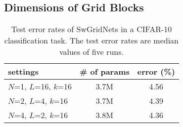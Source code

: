 \documentclass[10pt,twocolumn,letterpaper]{article}
\begin{document}
\subsection{Dimensions of Grid Blocks}

\begin{table}
\centering
 \caption{Test error rates of SwGridNets in a CIFAR-10 classification task.
 The test error rates are median values of five runs.}
 \vskip 3pt
 \label{table:result1}
 \begin{tabular}{|l|c|c|}
  \hline
  settings & \# of params & error (\%) \\
  \hline
  $N$=1, $L$=16, $k$=16 & 3.7M & 4.56 \\
  $N$=2, $L$=4, $k$=16 & 3.7M & 4.39 \\
  $N$=4, $L$=2, $k$=16 & 3.8M & 4.36 \\
  \hline 
 \end{tabular}
\end{table}
\end{document}
